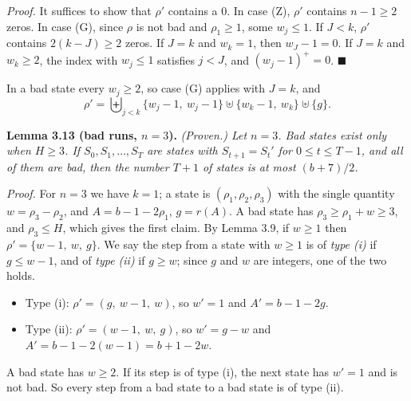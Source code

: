 \documentclass[11pt,letterpaper]{article}
\providecommand{\tightlist}{%
  \setlength{\itemsep}{0pt}\setlength{\parskip}{0pt}}
\theoremstyle{paperstyle}
\theoremstyle{paperstyledef}
\theoremstyle{paperstylerem}
\begin{document}
\emph{Proof.} It suffices to show that \(\rho'\) contains a \(0\). In case (Z), \(\rho'\) contains \(n - 1 \geq 2\) zeros. In case (G), since \(\rho\) is not bad and \(\rho_1 \geq 1\), some \(w_j \leq 1\). If \(J < k\), \(\rho'\) contains \(2(k-J) \geq 2\) zeros. If \(J = k\) and \(w_k = 1\), then \(w_J - 1 = 0\). If \(J = k\) and \(w_k \geq 2\), the index with \(w_j \leq 1\) satisfies \(j < J\), and \((w_j - 1)^+ = 0\). \(\blacksquare\)

In a bad state every \(w_j \geq 2\), so case (G) applies with \(J = k\), and \[\rho' = \biguplus_{j<k} \{w_j - 1,\ w_j - 1\} \uplus \{w_k - 1,\ w_k\} \uplus \{g\}. \tag{3.2}\]

\textbf{Lemma 3.13 (bad runs, \(n = 3\)).} \emph{(Proven.) Let \(n = 3\). Bad states exist only when \(H \geq 3\). If \(S_0, S_1, \dots, S_T\) are states with \(S_{t+1} = S_t'\) for \(0 \leq t \leq T-1\), and all of them are bad, then the number \(T + 1\) of states is at most \((b+7)/2\).}

\emph{Proof.} For \(n = 3\) we have \(k = 1\); a state is \((\rho_1, \rho_2, \rho_3)\) with the single quantity \(w = \rho_3 - \rho_2\), and \(A = b - 1 - 2\rho_1\), \(g = r(A)\). A bad state has \(\rho_3 \geq \rho_1 + w \geq 3\), and \(\rho_3 \leq H\), which gives the first claim. By Lemma 3.9, if \(w \geq 1\) then \(\rho' = \{w-1,\ w,\ g\}\). We say the step from a state with \(w \geq 1\) is of \emph{type (i)} if \(g \leq w - 1\), and of \emph{type (ii)} if \(g \geq w\); since \(g\) and \(w\) are integers, one of the two holds.

\begin{itemize}
\tightlist
\item
  Type (i): \(\rho' = (g,\ w-1,\ w)\), so \(w' = 1\) and \(A' = b - 1 - 2g\).
\item
  Type (ii): \(\rho' = (w-1,\ w,\ g)\), so \(w' = g - w\) and \(A' = b - 1 - 2(w-1) = b + 1 - 2w\).
\end{itemize}

A bad state has \(w \geq 2\). If its step is of type (i), the next state has \(w' = 1\) and is not bad. So every step from a bad state to a bad state is of type (ii).
\end{document}
